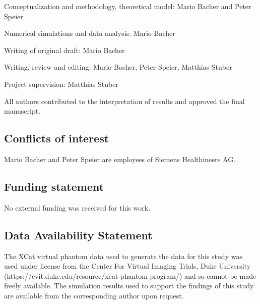 \documentclass[
]{article}
\begin{document}
Conceptualization and methodology, theoretical model: Mario Bacher and
Peter Speier

Numerical simulations and data analysis: Mario Bacher

Writing of original draft: Mario Bacher

Writing, review and editing: Mario Bacher, Peter Speier, Matthias Stuber

Project supervision: Matthias Stuber

All authors contributed to the interpretation of results and approved
the final manuscript.

\subsection{Conflicts of interest}\label{conflicts-of-interest}

Mario Bacher and Peter Speier are employees of Siemens Healthineers AG.

\subsection{Funding statement}\label{funding-statement}

No external funding was received for this work.

\subsection{Data Availability
Statement}\label{data-availability-statement}

The XCat virtual phantom data used to generate the data for this study
was used under license from the Center For Virtual Imaging Trials, Duke
University (https://cvit.duke.edu/resource/xcat-phantom-program/) and so
cannot be made freely available. The simulation results used to support
the findings of this study are available from the corresponding author
upon request.

\printbibliography

\appendix

\end{document}
